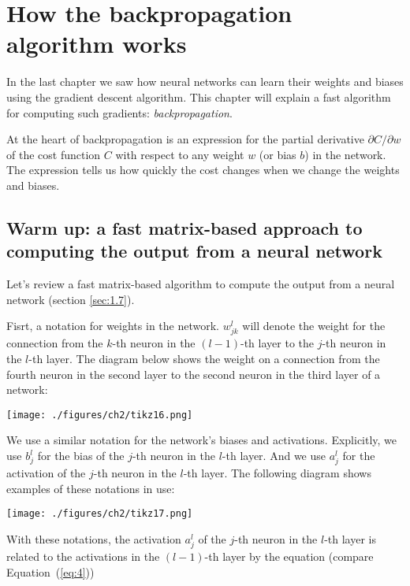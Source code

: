 \documentclass[a4paper,twoside,10pt]{book}
\begin{document}
\chapter{How the backpropagation algorithm works}
In the last chapter we saw how neural networks can learn their weights and biases using the gradient descent algorithm.  This chapter will explain a fast algorithm for computing such gradients: \textit{backpropagation}.

At the heart of backpropagation is an expression for the partial derivative $\partial{}C/\partial{}w$ of the cost function $C$ with respect to any weight $w$ (or bias $b$) in the network. The expression tells us how quickly the cost changes when we change the weights and biases.

\section{Warm up: a fast matrix-based approach to computing the output from a neural network}
Let's review a fast matrix-based algorithm to compute the output from a neural network (section \ref{sec:1.7}).

Fisrt, a notation for weights in the network. $w^l_{jk}$ will denote the weight for the connection from the $k$-th neuron in the $(l-1)$-th layer to the $j$-th neuron in the $l$-th layer. The diagram below shows the weight on a connection from the fourth neuron in the second layer to the second neuron in the third layer of a network:

\begin{center}
	\texttt{[image: ./figures/ch2/tikz16.png]}
\end{center}

We use a similar notation for the network's biases and activations. Explicitly, we use $b^l_j$ for the bias of the $j$-th neuron in the $l$-th layer. And we use $a^l_j$ for the activation of the $j$-th neuron in the $l$-th layer. The following diagram shows examples of these notations in use:
\begin{center}
\texttt{[image: ./figures/ch2/tikz17.png]}
\end{center}
With these notations, the activation $a^l_j$ of the $j$-th neuron in the $l$-th layer is related to the activations in the $(l-1)$-th layer by the equation (compare Equation~(\ref{eq:4}))
\end{document}
